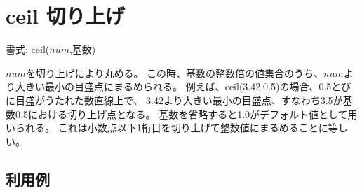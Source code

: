 
%

\section{ceil 切り上げ\label{sect:ceil}}

書式: ceil($num$,基数)

$num$を切り上げにより丸める。
この時、基数の整数倍の値集合のうち、$num$より大きい最小の目盛点にまるめられる。
例えば、ceil(3.42,0.5)の場合、0.5とびに目盛がうたれた数直線上で、
3.42より大きい最小の目盛点、すなわち3.5が基数0.5における切り上げ点となる。
基数を省略すると1.0がデフォルト値として用いられる。
これは小数点以下1桁目を切り上げて整数値にまるめることに等しい。

\subsection*{利用例}


%


